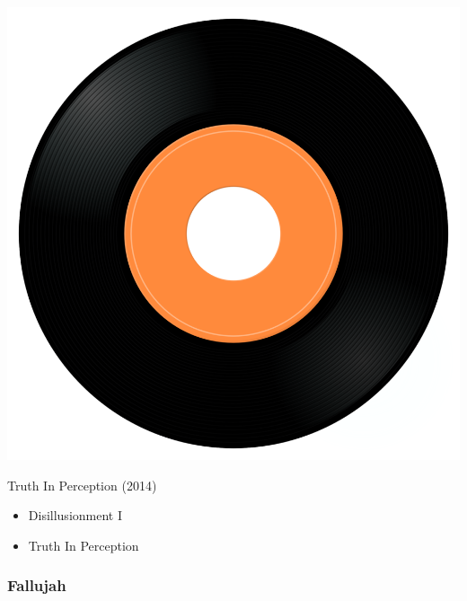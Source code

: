 \begin{minipage}[t]{0.25\textwidth}\vspace{0pt}
\captionsetup{type=figure}
\includegraphics[width=\textwidth]{Images/cover.png}
\caption*{Truth In Perception (2014)}
\end{minipage}
\begin{minipage}[t]{0.25\textwidth}\vspace{0pt}
\begin{itemize}[nosep,leftmargin=1em,labelwidth=*,align=left]
	\setlength{\itemsep}{0pt}
	\item Disillusionment I
	\item Truth In Perception
\end{itemize}
\end{minipage}

\subsubsection{Fallujah}

